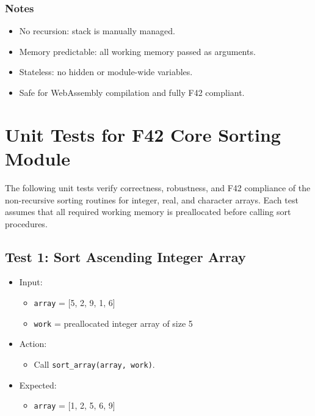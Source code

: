 \documentclass{article}
\begin{document}
\subsubsection{Notes}

\begin{itemize}
    \item No recursion: stack is manually managed.
    \item Memory predictable: all working memory passed as arguments.
    \item Stateless: no hidden or module-wide variables.
    \item Safe for WebAssembly compilation and fully F42 compliant.
\end{itemize}

\section{Unit Tests for F42 Core Sorting Module}

The following unit tests verify correctness, robustness, and F42 compliance of the non-recursive sorting routines for integer, real, and character arrays.
Each test assumes that all required working memory is preallocated before calling sort procedures.

\subsection{Test 1: Sort Ascending Integer Array}

\begin{itemize}
    \item Input:
    \begin{itemize}
        \item \texttt{array} = [5, 2, 9, 1, 6]
        \item \texttt{work} = preallocated integer array of size 5
    \end{itemize}
    \item Action:
    \begin{itemize}
        \item Call \texttt{sort\_array(array, work)}.
    \end{itemize}
    \item Expected:
    \begin{itemize}
        \item \texttt{array} = [1, 2, 5, 6, 9]
    \end{itemize}
\end{itemize}
\end{document}
